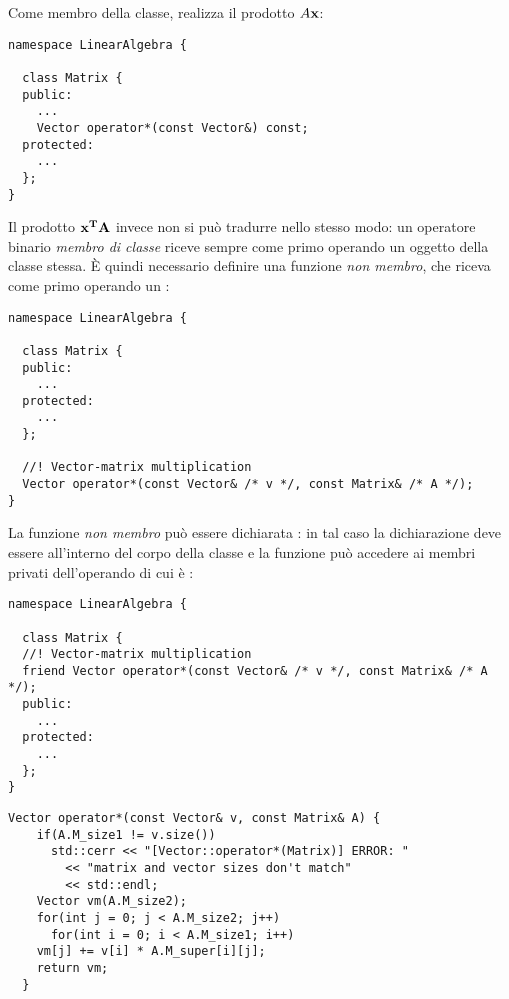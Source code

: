 Come membro della classe,  realizza
il prodotto $A \bf{x}$:
%
\label{code:matrix}
\begin{lstlisting}[caption=Dichiarazione della funzione membro \cpp{Matrix::operator*}]
namespace LinearAlgebra {

  class Matrix {
  public:
    ...
    Vector operator*(const Vector&) const;
  protected:
    ...
  };
}
\end{lstlisting}
\lstset{basicstyle=\scriptsize\sf}

\lstset{basicstyle=\sf}
Il prodotto $\bf{x}^T A$ invece non si pu\`o tradurre nello stesso
modo: un operatore binario \emph{membro di classe} riceve sempre come
primo operando un oggetto della classe stessa. \`E quindi necessario
definire una funzione  \emph{non membro},
che riceva come primo operando un :
\begin{lstlisting}[caption=Dichiarazione della funzione \emph{non
membro} \cpp{operator*}]
namespace LinearAlgebra {

  class Matrix {
  public:
    ...
  protected:
    ...
  };

  //! Vector-matrix multiplication
  Vector operator*(const Vector& /* v */, const Matrix& /* A */);
}
\end{lstlisting}
\lstset{basicstyle=\scriptsize\sf}

\lstset{basicstyle=\sf}
La funzione \emph{non membro}  pu\`o essere dichiarata
: in tal caso la dichiarazione deve essere all'interno del
corpo della classe e la funzione pu\`o accedere ai membri privati
dell'operando di cui \`e :
\begin{lstlisting}[caption=Dichiarazione della funzione \emph{non
membro} \cpp{operator*} come \cpp{friend}]
namespace LinearAlgebra {

  class Matrix {
  //! Vector-matrix multiplication
  friend Vector operator*(const Vector& /* v */, const Matrix& /* A */);
  public:
    ...
  protected:
    ...
  };
}
\end{lstlisting}

\begin{lstlisting}[caption=Implementazione della funzione \emph{non
membro} \cpp{operator*} come \cpp{friend}]
  Vector operator*(const Vector& v, const Matrix& A) {
    if(A.M_size1 != v.size())
      std::cerr << "[Vector::operator*(Matrix)] ERROR: "
		<< "matrix and vector sizes don't match"
		<< std::endl;
    Vector vm(A.M_size2);
    for(int j = 0; j < A.M_size2; j++)
      for(int i = 0; i < A.M_size1; i++)
	vm[j] += v[i] * A.M_super[i][j];
    return vm;
  }
\end{lstlisting}

